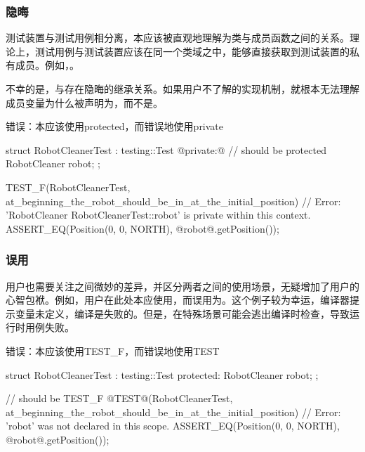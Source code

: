 \begin{content}
\subsubsection{隐晦}

测试装置与测试用例相分离，本应该被直观地理解为类与成员函数之间的关系。理论上，测试用例与测试装置应该在同一个类域之中，能够直接获取到测试装置的私有成员。例如，。

不幸的是，与存在隐晦的继承关系。如果用户不了解的实现机制，就根本无法理解成员变量为什么被声明为，而不是。

\begin{nodiff}{错误：本应该使用protected，而错误地使用private}
 \begin{c++}
struct RobotCleanerTest : testing::Test {
@private:@ // should be protected
  RobotCleaner robot;
};
 
TEST_F(RobotCleanerTest, at_beginning_the_robot_should_be_in_at_the_initial_position) {
  // Error: 'RobotCleaner RobotCleanerTest::robot' is private within this context.
  ASSERT_EQ(Position(0, 0, NORTH), @robot@.getPosition());
}
  \end{c++}
\end{nodiff}

\subsubsection{误用}

用户也需要关注之间微妙的差异，并区分两者之间的使用场景，无疑增加了用户的心智包袱。例如，用户在此处本应使用，而误用为。这个例子较为幸运，编译器提示变量未定义，编译是失败的。但是，在特殊场景可能会逃出编译时检查，导致运行时用例失败。

\begin{nodiff}{错误：本应该使用TEST\_F，而错误地使用TEST}
 \begin{c++}
struct RobotCleanerTest : testing::Test {
protected:
  RobotCleaner robot;
};

// should be TEST\_F
@TEST@(RobotCleanerTest, at_beginning_the_robot_should_be_in_at_the_initial_position) {
  // Error: 'robot' was not declared in this scope.
  ASSERT_EQ(Position(0, 0, NORTH), @robot@.getPosition());
}
  \end{c++}
\end{nodiff}


\end{content}
